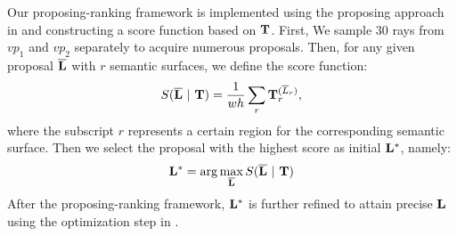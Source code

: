Our proposing-ranking framework is implemented using the proposing approach in \cite{hedau2009recovering} and constructing a score function based on $\mathbf{T}$. First, We sample 30 rays from $vp_1$ and $vp_2$ separately to acquire numerous proposals. Then, for any given proposal $\mathbf{\overline{L}}$ with $r$ semantic surfaces, we define the score function:
%
\begin{equation}
\label{eq:scorefunction}
S(\mathbf{\overline{L}}~|~\mathbf{T}) = \frac{1}{wh}\sum_r \mathbf{T}_r^{(\overline{L}_r)},
\end{equation}
%
where the subscript $r$ represents a certain region for the corresponding semantic surface. Then we select the proposal with the highest score as initial $\mathbf{L^*}$, namely:
%
\begin{equation}
\label{eq:initial}
\mathbf{L^*} = \arg\max_{\mathbf{\overline{L}}} S(\mathbf{\overline{L}}~|~\mathbf{T})
\end{equation}
%
After the proposing-ranking framework, $\mathbf{L^*}$ is further refined to attain precise $\mathbf{L}$ using the optimization step in \cite{dasgupta2016delay}.


